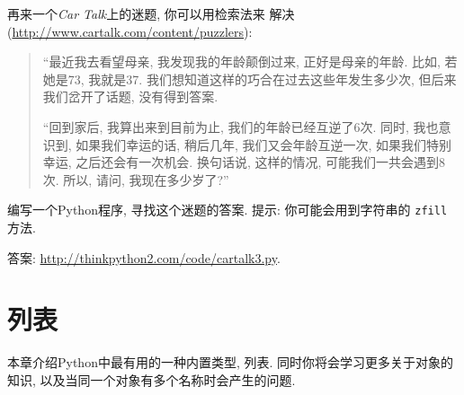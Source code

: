 \documentclass[10pt]{book}
\begin{document}
\begin{exercise}
再来一个{\em Car Talk}上的迷题, 你可以用检索法来
解决(\url{http://www.cartalk.com/content/puzzlers}):

\begin{quote}
%
``最近我去看望母亲, 我发现我的年龄颠倒过来, 正好是母亲的年龄. 
比如, 若她是73, 我就是37. 我们想知道这样的巧合在过去这些年发生多少次, 
但后来我们岔开了话题, 没有得到答案. 

``回到家后, 我算出来到目前为止, 我们的年龄已经互逆了6次. 
同时, 我也意识到, 如果我们幸运的话, 稍后几年, 我们又会年龄互逆一次, 
如果我们特别幸运, 之后还会有一次机会. 换句话说, 这样的情况, 
可能我们一共会遇到8次. 所以, 请问, 我现在多少岁了?''

\end{quote}

%
编写一个Python程序, 寻找这个迷题的答案. 
提示: 你可能会用到字符串的 {\tt zfill} 方法. 

答案: \url{http://thinkpython2.com/code/cartalk3.py}.

\end{exercise}


\chapter{列表}

本章介绍Python中最有用的一种内置类型, 列表. 
同时你将会学习更多关于对象的知识, 
以及当同一个对象有多个名称时会产生的问题. 
\end{document}

